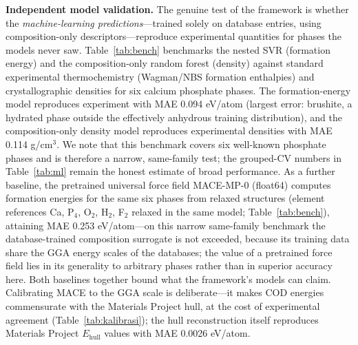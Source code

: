 \documentclass[review,11pt,a4paper]{elsarticle}
\begin{document}
\textbf{Independent model validation.} The genuine test of the framework is whether the \emph{machine-learning predictions}---trained solely on database entries, using composition-only descriptors---reproduce experimental quantities for phases the models never saw. Table~\ref{tab:bench} benchmarks the nested SVR (formation energy) and the composition-only random forest (density) against standard experimental thermochemistry (Wagman/NBS formation enthalpies) and crystallographic densities for six calcium phosphate phases. The formation-energy model reproduces experiment with MAE 0.094 eV/atom (largest error: brushite, a hydrated phase outside the effectively anhydrous training distribution), and the composition-only density model reproduces experimental densities with MAE 0.114 g/cm$^3$. We note that this benchmark covers six well-known phosphate phases and is therefore a narrow, same-family test; the grouped-CV numbers in Table~\ref{tab:ml} remain the honest estimate of broad performance. As a further baseline, the pretrained universal force field MACE-MP-0 (float64) computes formation energies for the same six phases from relaxed structures (element references Ca, P$_4$, O$_2$, H$_2$, F$_2$ relaxed in the same model; Table~\ref{tab:bench}), attaining MAE 0.253 eV/atom---on this narrow same-family benchmark the database-trained composition surrogate is not exceeded, because its training data share the GGA energy scales of the databases; the value of a pretrained force field lies in its generality to arbitrary phases rather than in superior accuracy here. Both baselines together bound what the framework's models can claim. Calibrating MACE to the GGA scale is deliberate---it makes COD energies commensurate with the Materials Project hull, at the cost of experimental agreement (Table~\ref{tab:kalibrasi}); the hull reconstruction itself reproduces Materials Project $E_\mathrm{hull}$ values with MAE 0.0026 eV/atom.
\end{document}

